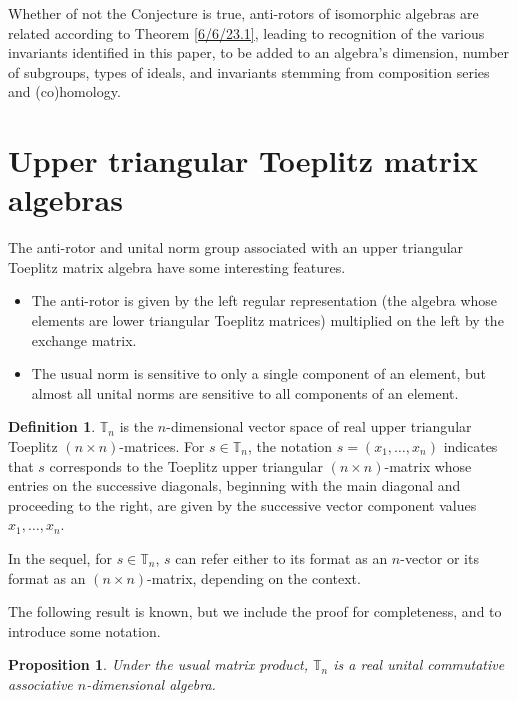 \documentclass{amsart}
\newtheorem{proposition}[theorem]{Proposition}
\theoremstyle{definition}
\newtheorem{definition}[theorem]{Definition}
\numberwithin{theorem}{section}
\numberwithin{equation}{section}
\begin{document}
Whether of not the Conjecture is true, anti-rotors of isomorphic algebras are related according to Theorem \ref{6/6/23.1}, leading to recognition of the various invariants identified in this paper, to be added to an algebra's dimension, number of subgroups, types of ideals, and invariants stemming from composition series and (co)homology.

\bigskip\bigskip
 
\appendix

\section{Upper triangular Toeplitz matrix algebras} \enlargethispage{1cm}

The anti-rotor and unital norm group associated with an upper triangular Toeplitz matrix algebra have some interesting features.
\begin{itemize}\item The anti-rotor is given by the left regular representation (the algebra whose elements are lower triangular Toeplitz matrices) multiplied on the left by the exchange matrix. \item The usual norm is sensitive to only a single component of an element, but almost all unital norms are sensitive to all components of an element.\end{itemize}


 \begin{definition}\label{5/4/22.1} $\mathbb{T}_n$ is the $n$-dimensional vector space of real upper triangular Toeplitz $(n\times n)$-matrices. For $s\in \mathbb{T}_n$, the notation $s=(x_1,\dots,x_n)$ indicates that $s$ corresponds to the Toeplitz upper triangular $(n\times n)$-matrix whose entries on the successive diagonals, beginning with the main diagonal and proceeding to the right, are given by the successive vector component values $x_1,\dots,x_n$.   
\end{definition}

In the sequel, for $s\in \mathbb{T}_n$, $s$ can refer either to its format as an $n$-vector or its format as an $(n\times n)$-matrix, depending on the context.


The following result is known, but we include the proof for completeness, and to introduce some notation.  



 \begin{proposition}\label{5/10/22.1} Under the usual matrix product, $\mathbb{T}_n$ is a real unital commutative associative $n$-dimensional algebra.\end{proposition} 
 
\end{document}
